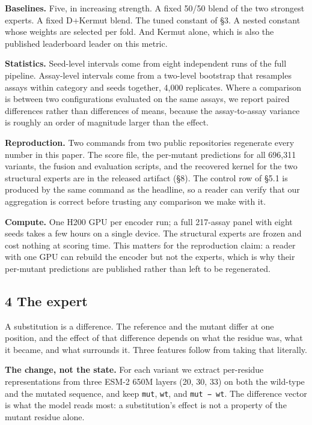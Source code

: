 \textbf{Baselines.} Five, in increasing strength. A fixed 50/50 blend of the two strongest experts. A fixed
D+Kermut blend. The tuned constant of §3. A nested constant whose weights are selected per fold. And
Kermut alone, which is also the published leaderboard leader on this metric.

\textbf{Statistics.} Seed-level intervals come from eight independent runs of the full pipeline. Assay-level
intervals come from a two-level bootstrap that resamples assays within category and seeds together,
4,000 replicates. Where a comparison is between two configurations evaluated on the same assays, we
report paired differences rather than differences of means, because the assay-to-assay variance is
roughly an order of magnitude larger than the effect.

\textbf{Reproduction.} Two commands from two public repositories regenerate every number in this paper. The
score file, the per-mutant predictions for all 696,311 variants, the fusion and evaluation scripts, and
the recovered kernel for the two structural experts are in the released artifact (§8). The control row
of §5.1 is produced by the same command as the headline, so a reader can verify that our aggregation is
correct before trusting any comparison we make with it.

\textbf{Compute.} One H200 GPU per encoder run; a full 217-assay panel with eight seeds takes a few hours on
a single device. The structural experts are frozen and cost nothing at scoring time. This matters for
the reproduction claim: a reader with one GPU can rebuild the encoder but not the experts, which is why
their per-mutant predictions are published rather than left to be regenerated.

\hypertarget{the-expert}{%
\subsection{4 The expert}\label{the-expert}}

A substitution is a difference. The reference and the mutant differ at one position, and the effect of
that difference depends on what the residue was, what it became, and what surrounds it. Three features
follow from taking that literally.

\textbf{The change, not the state.} For each variant we extract per-residue representations from three ESM-2
650M layers (20, 30, 33) on both the wild-type and the mutated sequence, and keep \texttt{mut}, \texttt{wt}, and
\texttt{mut\ −\ wt}. The difference vector is what the model reads most: a substitution's effect is not a
property of the mutant residue alone.

